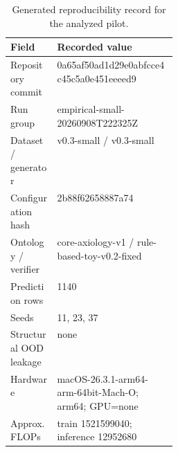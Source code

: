\begin{table}[t]\centering\scriptsize
\caption{Generated reproducibility record for the analyzed pilot.}
\label{tab:generated-reproducibility}
\begin{tabularx}{\linewidth}{@{}p{0.28\linewidth}X@{}}\toprule Field & Recorded value\\\midrule
Repository commit & 0a65af50ad1d29e0abfcce4c45c5a0e451eeeed9\\
Run group & empirical-small-20260908T222325Z\\
Dataset / generator & v0.3-small / v0.3-small\\
Configuration hash & 2b88f62658887a74\\
Ontology / verifier & core-axiology-v1 / rule-based-toy-v0.2-fixed\\
Prediction rows & 1140\\
Seeds & 11, 23, 37\\
Structural OOD leakage & none\\
Hardware & macOS-26.3.1-arm64-arm-64bit-Mach-O; arm64; GPU=none\\
Approx. FLOPs & train 1521599040; inference 12952680\\
\bottomrule
\end{tabularx}
\end{table}
